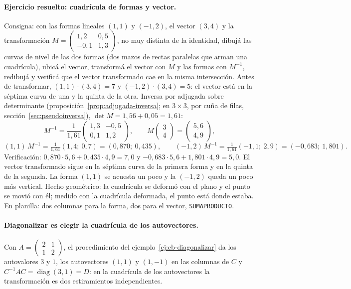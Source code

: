 \paragraph{Ejercicio resuelto: cuadrícula de formas y vector.} Consigna: con las formas lineales
\((1,1)\) y \((-1,2)\), el vector \((3,4)\) y la transformación
\(M=\begin{pmatrix}1{,}2&0{,}5\\-0{,}1&1{,}3\end{pmatrix}\), no muy distinta de la identidad,
dibujá las curvas de nivel de las dos formas (dos mazos de rectas paralelas que arman una
cuadrícula), ubicá el vector, transformá el vector con \(M\) y las formas con \(M^{-1}\), redibujá
y verificá que el vector transformado cae en la misma intersección. Antes de transformar, \((1,1)\cdot(3,4)=7\) y
\((-1,2)\cdot(3,4)=5\): el vector está en la séptima curva de una y la quinta de la otra.
Inversa por adjugada sobre determinante (proposición~\ref{prop:adjugada-inversa}; en \(3\times3\), por
cuña de filas, sección~\ref{sec:pseudoinversa}), \(\det M=1{,}56+0{,}05=1{,}61\):
\[
  M^{-1}=\frac1{1{,}61}\begin{pmatrix}1{,}3&-0{,}5\\0{,}1&1{,}2\end{pmatrix},\qquad
  M\begin{pmatrix}3\\4\end{pmatrix}=\begin{pmatrix}5{,}6\\4{,}9\end{pmatrix},
\]
\[
  (1,1)\,M^{-1}=\tfrac1{1{,}61}(1{,}4;\ 0{,}7)=(0{,}870;\ 0{,}435),\qquad
  (-1,2)\,M^{-1}=\tfrac1{1{,}61}(-1{,}1;\ 2{,}9)=(-0{,}683;\ 1{,}801).
\]
Verificación: \(0{,}870\cdot5{,}6+0{,}435\cdot4{,}9=7{,}0\) y
\(-0{,}683\cdot5{,}6+1{,}801\cdot4{,}9=5{,}0\). El vector transformado sigue en la séptima
curva de la primera forma y en la quinta de la segunda. La forma \((1,1)\) se acuesta un poco
y la \((-1,2)\) queda un poco más vertical. Hecho geométrico: la cuadrícula se deformó con el plano
y el punto se movió con él; medido con la cuadrícula deformada, el punto está donde estaba. En
planilla: dos columnas para la forma, dos para el vector, \texttt{SUMAPRODUCTO}.

\paragraph{Diagonalizar es elegir la cuadrícula de los autovectores.} Con
\(A=\left(\begin{smallmatrix}2&1\\1&2\end{smallmatrix}\right)\), el procedimiento del
ejemplo~\ref{ej:cb-diagonalizar} da los autovalores \(3\) y \(1\), los autovectores \((1,1)\)
y \((1,-1)\) en las columnas de \(C\) y \(C^{-1}AC=\operatorname{diag}(3,1)=D\): en la cuadrícula
de los autovectores la transformación es dos estiramientos independientes.

